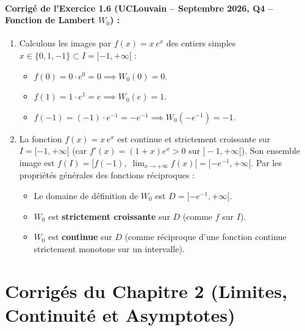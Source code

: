 \paragraph{Corrigé de l'Exercice 1.6 (UCLouvain -- Septembre 2026, Q4 -- Fonction de Lambert $W_0$) :}
\begin{enumerate}[label=(\alph*)]
    \item Calculons les images par $f(x) = x\,e^x$ des entiers simples $x \in \{0, 1, -1\} \subset I = [-1, +\infty[$ :
    \begin{itemize}
        \item $f(0) = 0 \cdot e^0 = 0 \implies \boxed{W_0(0) = 0}$.
        \item $f(1) = 1 \cdot e^1 = e \implies \boxed{W_0(e) = 1}$.
        \item $f(-1) = (-1)\cdot e^{-1} = -e^{-1} \implies \boxed{W_0(-e^{-1}) = -1}$.
    \end{itemize}
    \item La fonction $f(x) = x\,e^x$ est continue et strictement croissante sur $I = [-1, +\infty[$ (car $f'(x) = (1+x)e^x > 0$ sur $]-1, +\infty[$). Son ensemble image est $f(I) = \bigl[f(-1),\; \lim_{x \to +\infty} f(x)\bigr[ = [-e^{-1}, +\infty[$. Par les propriétés générales des fonctions réciproques :
    \begin{itemize}
        \item Le domaine de définition de $W_0$ est $\boxed{D = [-e^{-1}, +\infty[}$.
        \item $W_0$ est \textbf{strictement croissante} sur $D$ (comme $f$ sur $I$).
        \item $W_0$ est \textbf{continue} sur $D$ (comme réciproque d'une fonction continue strictement monotone sur un intervalle).
    \end{itemize}
\end{enumerate}

\section{Corrigés du Chapitre 2 (Limites, Continuité et Asymptotes)}

